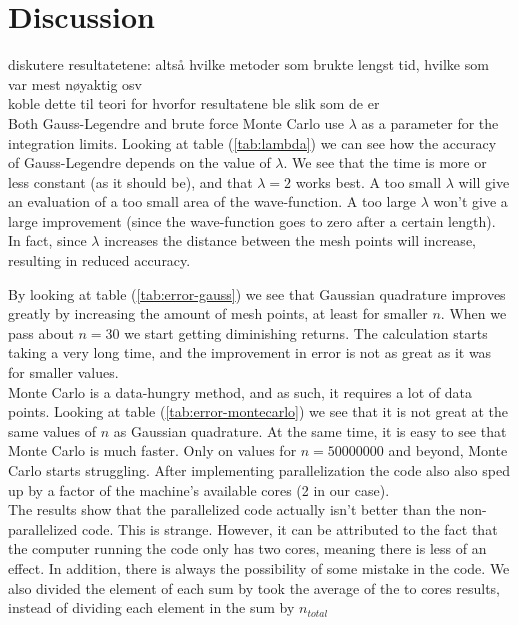\documentclass{article}
\begin{document}
\vspace{1cm}

\section{Discussion} \label{sec:Discussion}

diskutere resultatetene: altså hvilke metoder som brukte lengst tid, hvilke som var mest nøyaktig osv \\
koble dette til teori for hvorfor resultatene ble slik som de er \\

Both Gauss-Legendre and brute force Monte Carlo use $\lambda$ as a parameter for the integration limits. Looking at table (\ref{tab:lambda}) we can see how the accuracy of Gauss-Legendre depends on the value of $\lambda$. We see that the time is more or less constant (as it should be), and that $\lambda=2$ works best. A too small $\lambda$ will give an evaluation of a too small area of the wave-function. A too large $\lambda$ won't give a large improvement (since the wave-function goes to zero after a certain length). In fact, since $\lambda$ increases the distance between the mesh points will increase, resulting in reduced accuracy.

By looking at table (\ref{tab:error-gauss}) we see that Gaussian quadrature improves greatly by increasing the amount of mesh points, at least for smaller $n$. When we pass about $n=30$ we start getting diminishing returns. The calculation starts taking a very long time, and the improvement in error is not as great as it was for smaller values. \\

Monte Carlo is a data-hungry method, and as such, it requires a lot of data points. Looking at table (\ref{tab:error-montecarlo}) we see that it is not great at the same values of $n$ as Gaussian quadrature. At the same time, it is easy to see that Monte Carlo is much faster. Only on values for $n=50000000$ and beyond, Monte Carlo starts struggling. After implementing parallelization the code also also sped up  by a factor of the machine's available cores (2 in our case).\\

The results show that the parallelized code actually isn't better than the non-parallelized code. This is strange. However, it can be attributed to the fact that the computer running the code only has two cores, meaning there is less of an effect. In addition, there is always the possibility of some mistake in the code. We also divided the element of each sum by took the average of the to cores results, instead of dividing each element in the sum by $n_{total}$
\end{document}
